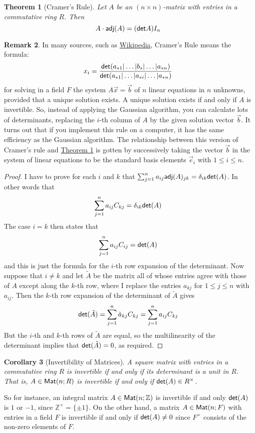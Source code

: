 \documentclass[11pt]{amsbook}
\newtheorem{theorem}{Theorem}[section]
\newtheorem{corollary}[theorem]{Corollary}
\theoremstyle{definition}
\newtheorem{rem}[theorem]{Remark}
\begin{document}
\begin{theorem} [Cramer's Rule] \label{Cramer} Let $A$ be an $(n\times n)$-matrix with entries in a commutative ring $R$. Then $$A\cdot {\sf adj}(A) = ({\sf det} A)I_n$$
\end{theorem}

\begin{rem} In many sources, such as \href{http://en.wikipedia.org/wiki/Cramer's_rule}{Wikipedia}, Cramer's Rule means the formula: $$x_i = \frac{{\sf det}(a_{*1} | \ldots | b_{*} | \ldots | a_{*n} )}{{\sf det}(a_{*1} | \ldots |a_{*i} |\ldots | a_{*n})}$$ for solving in a field $F$ the system $A \vec{x} = \vec{b}$ of $n$ linear equations in $n$ unknowns, provided that a unique solution exists. A unique solution exists if and only if $A$ is invertible. So, instead of applying the Gaussian algorithm, you can calculate lots of determinants, replacing the $i$-th column of $A$ by the given solution vector $\vec{b}$. It turns out that if you implement this rule on a computer, it has the same efficiency as the Gaussian algorithm. The relationship between this version of Cramer's rule and \hyperref[Cramer]{Theorem \ref{Cramer}} is gotten by successively taking the vector $\vec{b}$ in the system of linear equations to be the standard basis elements $\vec{e}_i$ with $1\leqslant i \leqslant n$.
\end{rem}

\begin{proof}
I have to prove for each $i$ and $k$ that $\sum_{j=1}^n a_{ij} {\sf adj}(A)_{jk} = \delta_{ik} {\sf det}(A)$. In other words that $$\sum_{j=1}^n a_{ij} C_{kj} = \delta_{ik} {\sf det}(A)$$ The case $i=k$ then states that $$\sum_{j=1}^n a_{ij} C_{ij} = {\sf det}(A)$$ and this is just the formula for the $i$-th row expansion of the determinant. Now suppose that $i\neq k$ and let $\tilde{A}$ be the matrix all of whose entries agree with those of $A$ except along the $k$-th row, where I replace the entries $a_{kj}$ for $1\leqslant j \leqslant n$ with $a_{ij}$. Then the $k$-th row expansion of the determinant of $\tilde{A}$ gives $${\sf det}(\tilde{A}) = \sum_{j=1}^n \tilde{a}_{kj} C_{kj} = \sum_{j=1}^n a_{ij} C_{kj}$$ But the $i$-th and $k$-th rows of $\tilde{A}$ are equal, so the multilinearity of the determinant implies that ${\sf det}(\tilde{A}) = 0$, as required.
\end{proof}

\begin{corollary} [Invertibility of Matrices] A square matrix with entries in a commutative ring $R$ is invertible if and only if its determinant is a unit in $R$. That is, $A\in {\sf Mat}(n;R)$ is invertible if and only if ${\sf det}(A) \in R^{\times}$.
\end{corollary}
So for instance, an integral matrix $A\in {\sf Mat}(n;\mathbb{Z})$ is invertible if and only ${\sf det}(A)$ is $1$ or $-1$, since $\mathbb{Z}^{\times} = \{ \pm 1\}$. On the other hand, a matrix $A \in {\sf Mat}(n;F)$ with entries in a field $F$ is invertible if and only if ${\sf det}(A) \neq 0$ since $F^{\times}$ consists of the non-zero elements of $F$.
\end{document}
